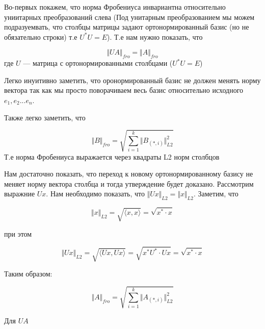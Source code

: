 \documentclass{article}
\begin{document}
    Во-первых покажем, что норма Фробениуса инвариантна относительно униитарных преобразований слева 
    (Под унитарным преобразованием мы можем подразуемвать, что столбцы матрицы задают ортонормированный базис (но не обязательно строки) т.е $U^{*}U = E$). 
    Т.е нам нужно показать, что  

    \begin{equation}
        \Vert U  A  \Vert_{fro} = \Vert A \Vert_{fro} 
    \end{equation}
    где $U$ --- матрица с ортонормированными столбцами ($U^{*}U = E$)

    \quad 

    Легко инуитивно заметить, что оронормированный базис не должен менять норму вектора так как мы просто поворачиваем весь базис относительно исходного $e_{1}, e_{2} ... e_{n}$.

    \quad 

    Также легко заметить, что 

    \begin{equation}
        \Vert B \Vert_{fro} = \sqrt{ \sum_{i = 1}^{k} \Vert B_{(*, i)} \Vert_{L2}^{2} }
    \end{equation}
    Т.е норма Фробениуса выражается через квадраты L2 норм столбцов
    
    \quad 

    Нам достаточно показать, что переход к новому ортонормированному базису не меняет норму вектора столбца и тогда утверждение будет доказано.
    Рассмотрим выражние $U x$. Нам необходимо показать, что $\Vert Ux \Vert_{L2} = \Vert x \Vert_{L2}$. Заметим, что 

    \begin{equation}
        \Vert x \Vert_{L2} = \sqrt{\langle x, x \rangle} = \sqrt{x^{*} \cdot x}
    \end{equation}

    при этом 

    \begin{equation}
        \Vert Ux \Vert_{L2} = \sqrt{\langle  Ux,  Ux \rangle} = \sqrt{x^{*} U^{*} \cdot U x} = \sqrt{x^{*} \cdot x}
    \end{equation}

    Таким образом: 

    \begin{equation}
        \Vert A \Vert_{fro} = \sqrt{ \sum_{i = 1}^{k} \Vert A_{(*, i)} \Vert_{L2}^{2} }
    \end{equation}

    Для $UA$
\end{document}
